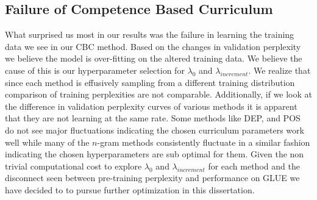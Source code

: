 \subsection{Failure of Competence Based Curriculum}
What surprised us most in our results was the failure in learning the training data we see in our CBC method. Based on the changes in validation perplexity we believe the model is over-fitting on the altered training data. We believe the cause of this is our hyperparameter selection for $\lambda_0$ and $\lambda_{increment}$. We realize that since each method is effusively sampling from a different training distribution comparison of training perplexities are not comparable. Additionally, if we look at the difference in validation perplexity curves of various methods it is apparent that they are not learning at the same rate. Some methods like DEP, and POS do not see major fluctuations indicating the chosen curriculum parameters work well while many of the $n$-gram methods consistently fluctuate in a similar fashion indicating the chosen hyperparameters are sub optimal for them. Given the non trivial computational cost to explore $\lambda_0$ and $\lambda_{increment}$ for each method and the disconnect seen between pre-training perplexity and performance on GLUE we have decided to to pursue further optimization in this dissertation.
